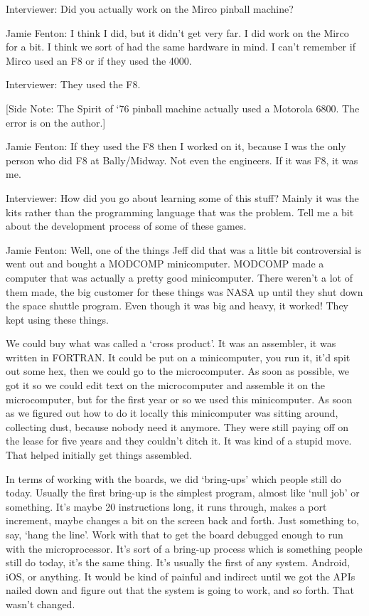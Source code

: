 \textcolor{interviewer}{Interviewer:} Did you actually work on the Mirco pinball machine?

\textcolor{interviewee}{Jamie Fenton:} I think I did, but it didn’t get very far. I did work on the Mirco for a bit. I think we sort of had the same hardware in mind. I can’t remember if Mirco used an F8 or if they used the 4000.

\textcolor{interviewer}{Interviewer:} They used the F8. 

[Side Note: The Spirit of ‘76 pinball machine actually used a Motorola 6800. The error is on the author.]

\textcolor{interviewee}{Jamie Fenton:} If they used the F8 then I worked on it, because I was the only person who did F8 at Bally/Midway. Not even the engineers. If it was F8, it was me.

\textcolor{interviewer}{Interviewer:} How did you go about learning some of this stuff? Mainly it was the kits rather than the programming language that was the problem. Tell me a bit about the development process of some of these games.

\textcolor{interviewee}{Jamie Fenton:} Well, one of the things Jeff did that was a little bit controversial is went out and bought a MODCOMP minicomputer. MODCOMP made a computer that was actually a pretty good minicomputer. There weren’t a lot of them made, the big customer for these things was NASA  up until they shut down the space shuttle program. Even though it was big and heavy, it worked! They kept using these things.

We could buy what was called a ‘cross product’. It was an assembler, it was written in FORTRAN. It could be put on a minicomputer, you run it, it’d spit out some hex, then we could go to the microcomputer. As soon as possible, we got it so we could edit text on the microcomputer and assemble it on the microcomputer, but for the first year or so we used this minicomputer. As soon as we figured out how to do it locally this minicomputer was sitting around, collecting dust, because nobody need it anymore. They were still paying off on the lease for five years and they couldn’t ditch it. It was kind of a stupid move. That helped initially get things assembled.

In terms of working with the boards, we did ‘bring-ups’ which people still do today. Usually the first bring-up is the simplest program, almost like ‘null job’ or something. It’s maybe 20 instructions long, it runs through, makes a port increment, maybe changes a bit on the screen back and forth. Just something to, say, ‘hang the line’. Work with that to get the board debugged enough to run with the microprocessor. It’s sort of a bring-up process which is something people still do today, it’s the same thing. It’s usually the first of any system. Android, iOS, or anything. It would be kind of painful and indirect until we got the APIs nailed down and figure out that the system is going to work, and so forth. That wasn’t changed.

